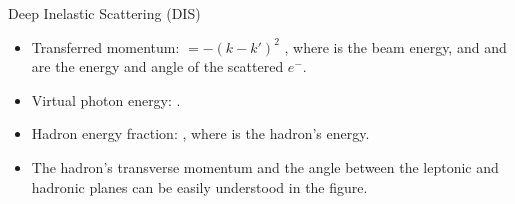 \begin{frame}{Deep Inelastic Scattering (DIS)}
    \label{10.12::dis}

    \begin{itemize}
        \item
            Transferred momentum:  $= -(k - k')^2$ , where  is the beam energy, and  and  are the energy and angle of the scattered $e^-$.

        \item
            Virtual photon energy: .

        \item
            Hadron energy fraction: , where  is the hadron's energy.

        \item
            The hadron's transverse momentum  and the angle between the leptonic and hadronic planes  can be easily understood in the figure.
    \end{itemize}

    \begin{center}
        \begin{figure}[t]
        \end{figure}
    \end{center}
\end{frame}


